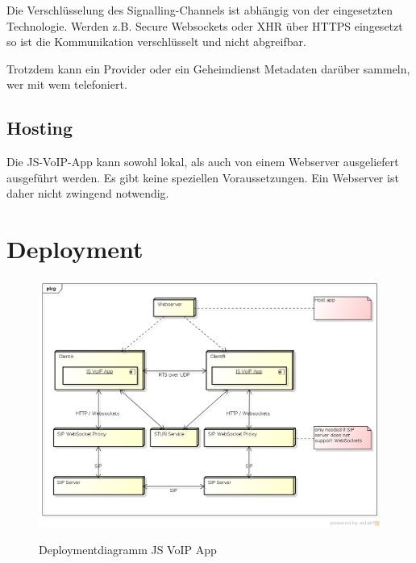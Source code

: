 		Die Verschlüsselung des Signalling-Channels ist abhängig von der eingesetzten
		Technologie. Werden z.B. Secure Websockets oder XHR über HTTPS eingesetzt so ist die Kommunikation verschlüsselt und nicht abgreifbar.
		
		Trotzdem kann ein Provider oder ein Geheimdienst Metadaten darüber sammeln, wer mit wem telefoniert.
		  
	\subsection{Hosting}
		Die JS-VoIP-App kann sowohl lokal, als auch von einem
		Webserver ausgeliefert ausgeführt werden. Es gibt keine speziellen Voraussetzungen. Ein Webserver ist daher nicht zwingend notwendig.
	
\clearpage
\section{Deployment}
	\begin{figure}[h]
		\centering
		\includegraphics[height=0.7\textwidth]{../architekturanalayse/img/deployment.png}
		\label{img:deployment}
		\caption{Deploymentdiagramm JS VoIP App}
	\end{figure}
	